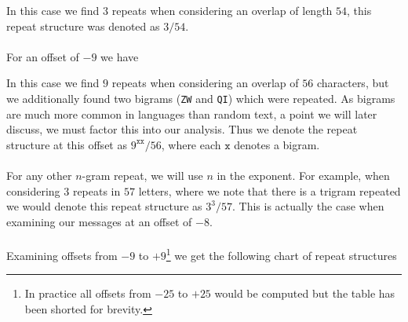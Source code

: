   In this case we find $3$ repeats when considering an overlap of
  length $54$, this repeat structure was denoted as $3/54$.
  \\\\For an offset of $-9$ we have
  \begin{center}
  \end{center}
  In this case we find $9$ repeats when considering an overlap of
  $56$ characters, but we additionally found two bigrams (\texttt{ZW}
  and \texttt{QI}) which were repeated. As bigrams are much more
  common in languages than random text, a point we will later
  discuss, we must factor this into our analysis. Thus we denote the
  repeat structure at this offset as $9^{\texttt{xx}}/56$, where each
  $\texttt{x}$ denotes a bigram.\\\\For any other $n$-gram repeat, we
  will use $n$ in the exponent. For example, when considering $3$
  repeats in $57$ letters, where we note that there is a trigram
  repeated we would denote this repeat structure as $3^{3}/57$. This
  is actually the case when examining our messages at an offset of $-8$.
  \\\\Examining offsets from $-9$ to $+9$\footnote{In practice all
    offsets from $-25$ to $+25$ would be computed but the table has
  been shorted for brevity.} we get the following chart of repeat structures
